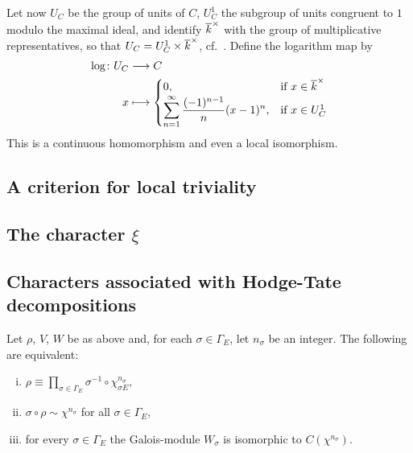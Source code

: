 \begin{subappendices}
Let now $U_C$ be the group of units of $C$, $U_C^1$ the subgroup of units
congruent to $1$ modulo the maximal ideal, and identify ${\overline{k}}^\times$
with the group of multiplicative representatives, so that $U_C = U_C^1 \times
{\overline{k}}^\times$, cf.\ \cite[44]{29}. Define the logarithm map by
\begin{align*}
	\log \colon U_C &\longrightarrow C \\
	x &\longmapsto
	\begin{cases}
		0, & \text{if } x \in {\overline{k}}^\times \\
		\displaystyle \sum_{n=1}^{\infty} \frac{(-1)^{n-1}}{n} (x-1)^n, & \text{if } x \in U_C^1
	\end{cases}
\end{align*}
This is a continuous homomorphism and even a local isomorphism.

\subsection{A criterion for local triviality}
\label{sec:III_A3}

\subsection{The character \texorpdfstring{$\xi$}{ξ}}%
\label{sec:III_A4}

\subsection{Characters associated with Hodge-Tate decompositions}
\label{sec:III_A5}

\begin{thm}\label{thm:III_A5_2}
Let $\rho$, $V$, $W$ be as above and, for each $\sigma \in \Gamma_E$, let
$n_\sigma$ be an integer. The following are equivalent:
\begin{enumerate}[(i), series=thm_IIIA5_2]
	\item\label{thm:III_A5_2i}
		$\displaystyle \rho \equiv \prod_{\sigma \in \Gamma_E}
		\sigma^{-1} \circ \chi_{\sigma E}^{n_\sigma},$
	\item\label{thm:III_A5_2ii}
		$\sigma\circ \rho \sim \chi^{n_\sigma}$ for all $\sigma \in
		\Gamma_E$,
	\item\label{thm:III_A5_2iii}
		for every $\sigma \in \Gamma_E$ the Galois-module $W_\sigma$ is
		isomorphic to $C(\chi^{n_\sigma})$.
\end{enumerate}
\end{thm}


\end{subappendices}
